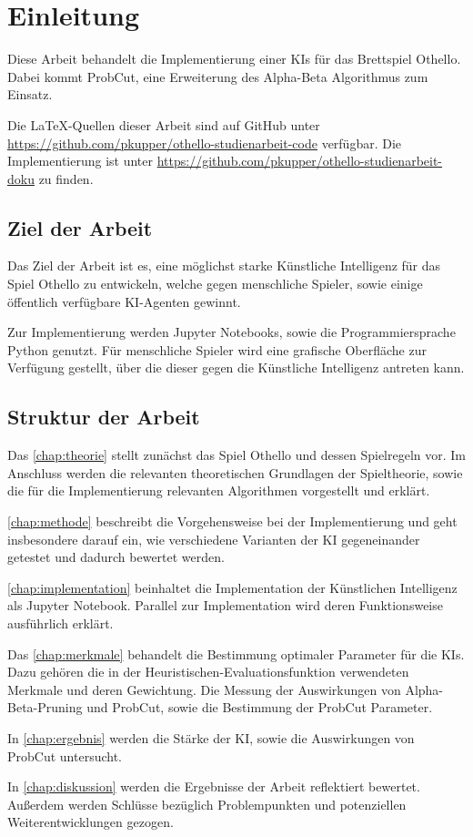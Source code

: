 
\chapter{Einleitung}
\label{chap:einleitung}

Diese Arbeit behandelt die Implementierung einer \acp{KI} für das Brettspiel Othello. Dabei kommt
ProbCut\cite[S.~1]{probcut}, eine Erweiterung des Alpha-Beta Algorithmus zum Einsatz.

Die \LaTeX-Quellen dieser Arbeit sind auf GitHub unter \url{https://github.com/pkupper/othello-studienarbeit-code}
verfügbar. Die Implementierung ist unter \url{https://github.com/pkupper/othello-studienarbeit-doku} zu finden.

\section{Ziel der Arbeit}
Das Ziel der Arbeit ist es, eine möglichst starke Künstliche Intelligenz für das Spiel Othello zu entwickeln, welche
gegen menschliche Spieler, sowie einige öffentlich verfügbare KI-Agenten gewinnt.

Zur Implementierung werden Jupyter Notebooks, sowie die Programmiersprache Python genutzt.
Für menschliche Spieler wird eine grafische Oberfläche zur Verfügung gestellt, über
die dieser gegen die Künstliche Intelligenz antreten kann.

\section{Struktur der Arbeit}
Das \autoref{chap:theorie} stellt zunächst das Spiel Othello und dessen Spielregeln vor. Im Anschluss werden die
relevanten theoretischen Grundlagen der Spieltheorie, sowie die für die Implementierung relevanten Algorithmen
vorgestellt und erklärt.

\autoref{chap:methode} beschreibt die Vorgehensweise bei der Implementierung und geht insbesondere darauf ein, wie
verschiedene Varianten der KI gegeneinander getestet und dadurch bewertet werden.

\autoref{chap:implementation} beinhaltet die Implementation der Künstlichen Intelligenz als Jupyter Notebook. Parallel
zur Implementation wird deren Funktionsweise ausführlich erklärt.

Das \autoref{chap:merkmale} behandelt die Bestimmung optimaler Parameter für die \acp{KI}. Dazu gehören die in der
Heuristischen-Evaluationsfunktion verwendeten Merkmale und deren Gewichtung. Die Messung der Auswirkungen von
Alpha-Beta-Pruning und ProbCut, sowie die Bestimmung der ProbCut Parameter.

In \autoref{chap:ergebnis} werden die Stärke der KI, sowie die Auswirkungen von ProbCut untersucht.

In \autoref{chap:diskussion} werden die Ergebnisse der Arbeit reflektiert bewertet. Außerdem werden Schlüsse bezüglich
Problempunkten und potenziellen Weiterentwicklungen gezogen.